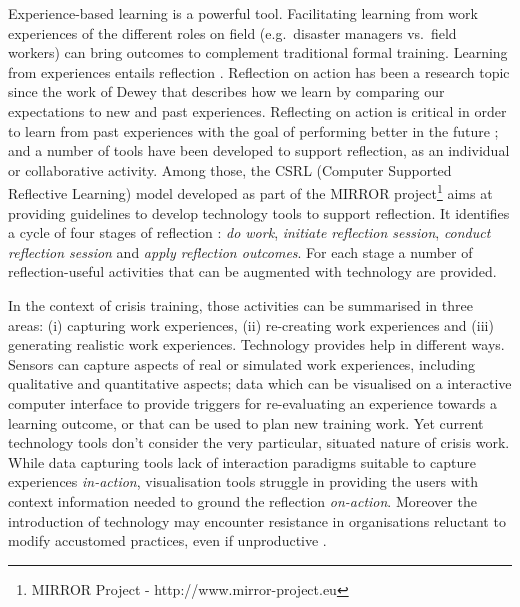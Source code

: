 Experience-based learning is a powerful tool. Facilitating learning from
work experiences of the different roles on field (e.g.~disaster managers
vs.~field workers) can bring outcomes to complement traditional formal
training. Learning from experiences entails reflection
\autocites{boud1985reflection}{Dewey:1998ug}{kolb1974toward}. Reflection
on action has been a research topic since the work of Dewey
\autocite{dewey1933we} that describes how we learn by comparing our
expectations to new and past experiences. Reflecting on action is
critical in order to learn from past experiences with the goal of
performing better in the future
\autocites{boud1985reflection}{Schon:1983ut}; and a number of tools have
been developed to support reflection, as an individual or collaborative
activity. Among those, the CSRL (Computer Supported Reflective Learning)
model developed as part of the MIRROR project\footnote{MIRROR Project -
  http://www.mirror-project.eu} aims at providing guidelines to develop
technology tools to support reflection. It identifies a cycle of four
stages of reflection \autocite{Krogstie:2013kf}: \emph{do work},
\emph{initiate reflection session}, \emph{conduct reflection session}
and \emph{apply reflection outcomes}. For each stage a number of
reflection-useful activities that can be augmented with technology are
provided.

In the context of crisis training, those activities can be summarised in
three areas: (i) capturing work experiences, (ii) re-creating work
experiences and (iii) generating realistic work experiences. Technology
provides help in different ways. Sensors can capture aspects of real or
simulated work experiences, including qualitative and quantitative
aspects; data which can be visualised on a interactive computer
interface to provide triggers for re-evaluating an experience towards a
learning outcome, or that can be used to plan new training work. Yet
current technology tools don't consider the very particular, situated
nature of crisis work. While data capturing tools lack of interaction
paradigms suitable to capture experiences \emph{in-action},
visualisation tools struggle in providing the users with context
information needed to ground the reflection \emph{on-action}. Moreover
the introduction of technology may encounter resistance in organisations
reluctant to modify accustomed practices, even if unproductive
\autocite{JCCM:JCCM15}.

